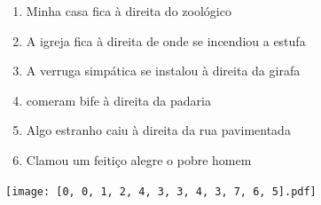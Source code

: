 \documentclass[12pt]{article}
\begin{document}
		 

\pagebreak


	\begin{enumerate}
		  \sffamily %
		  \large %


\vfill \item
Minha casa fica	%
à direita
do zoológico	%

\vfill \item
A igreja fica	%
à direita
de onde se incendiou a estufa	%

\vfill \item
A verruga simpática se instalou	%
à direita
da girafa	%

\vfill \item
comeram bife	%
à direita
da padaria	%

\vfill \item
Algo estranho caiu	%
à direita
da rua pavimentada	%

\vfill \item
Clamou um feitiço alegre	%
o pobre homem	%
	\end{enumerate}
		  
		  \hfill

		  \vfill

\texttt{[image: [0, 0, 1, 2, 4, 3, 3, 4, 3, 7, 6, 5].pdf]}


	\hfill	  	  


\pagebreak			
\end{document}
